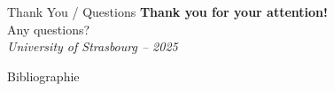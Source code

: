 \documentclass{beamer}
\begin{document}
\begin{frame}{Thank You / Questions}
\centering
\Huge \textbf{Thank you for your attention!} \\
\vspace{1cm}
\Large Any questions? \\
\vspace{0.5cm}
\textit{University of Strasbourg – 2025}
\end{frame}




\begin{frame}{Bibliographie}
\end{frame}
\end{document}

